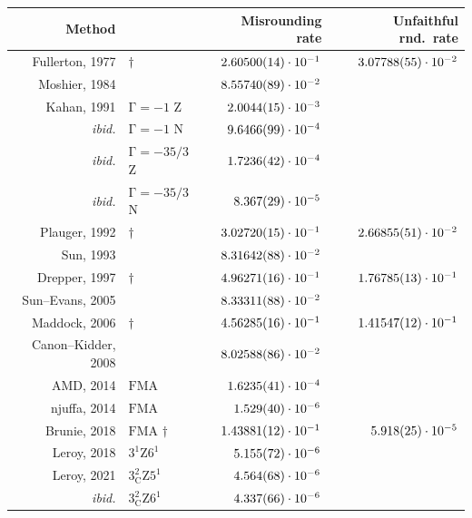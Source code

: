 ﻿\documentclass[10pt, a4paper, twoside]{basestyle}
\begin{document}
\begin{table}[b!]
\setmainfont[Mapping=tex-text,
             Numbers={OldStyle, Monospaced},
             Ligatures={TeX, Common, Discretionary},
             SmallCapsFeatures={Letters=SmallCaps},
             Contextuals=WordFinal,]{Linux Libertine O}
\begin{center}
\begin{tabular}{rlrr}
Method && Misrounding rate & Unfaithful rnd.~rate \\
\hline
Fullerton, 1977& $\dagger$  & $2.60500(14)\cdot10^{-1}$ & $3.07788(55)\cdot10^{-2}$ \\
Moshier, 1984&              & $8.55740(89)\cdot10^{-2}$ \\
Kahan, 1991 & $\mathrm{Γ}=-1$ $\mathrm{Z}$     & $2.0044(15)\cdot10^{-3}$  \\
\emph{ibid.}& $\mathrm{Γ}=-1$ $\mathrm{N}$     & $9.6466(99)\cdot10^{-4}$  \\
\emph{ibid.}& $\mathrm{Γ}=-35/3$ $\mathrm{Z}$  & $1.7236(42)\cdot10^{-4}$  \\
\emph{ibid.}& $\mathrm{Γ}=-35/3$ $\mathrm{N}$  & $8.367(29)\cdot10^{-5}$   \\
Plauger, 1992& $\dagger$    & $3.02720(15)\cdot10^{-1}$ & $2.66855(51)\cdot10^{-2}$\\
Sun,     1993&              & $8.31642(88)\cdot10^{-2}$ \\
Drepper, 1997& $\dagger$    & $4.96271(16)\cdot10^{-1}$ & $1.76785(13)\cdot10^{-1}$ \\
Sun--Evans, 2005&           & $8.33311(88)\cdot10^{-2}$ \\
Maddock, 2006& $\dagger$    & $4.56285(16)\cdot10^{-1}$ & $1.41547(12)\cdot10^{-1}$\\
Canon--Kidder, 2008&        & $8.02588(86)\cdot10^{-2}$ \\
AMD, 2014& $\mathrm{FMA}$              & $1.6235(41)\cdot10^{-4}$ \\
njuffa, 2014& $\mathrm{FMA}$           & $1.529(40)\cdot10^{-6}$ \\
Brunie, 2018& $\mathrm{FMA}$ $\dagger$            & $1.43881(12)\cdot10^{-1}$ & $5.918(25)\cdot10^{-5}$\\
Leroy, 2018 & $3^1\mathrm{Z}6^1$              & $5.155(72)\cdot10^{-6}$ \\
Leroy, 2021 & $3^2_{\mathrm{C}}\mathrm{Z}5^1$ & $4.564(68)\cdot10^{-6}$ \\
\emph{ibid.}& $3^2_{\mathrm{C}}\mathrm{Z}6^1$ & $4.337(66)\cdot10^{-6}$ \\

\end{tabular}
\end{center}
\end{table}
\end{document}
